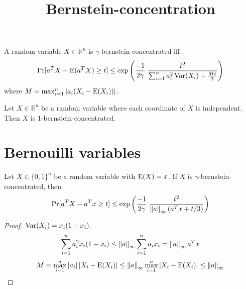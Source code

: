 

\title{Bernstein-concentration}



\maketitle
\initMinimal{}

\begin{definition}
A random variable $X \in \mathbb{R}^n$ is $\gamma$-bernstein-concentrated iff
\[ \Pr[a^TX - \operatorname*{E}(a^TX) \ge t]
\le \exp\left( \frac{-1}{2\gamma} \; \frac{t^2}{\sum_{i=1}^n a_i^2 \operatorname*{Var}(X_i) + \frac{Mt}{3}} \right) \]
where $M = \max_{i=1}^n \left\lvert a_i(X_i - \operatorname*{E}(X_i)) \right\rvert$.
\end{definition}

\begin{theorem}
Let $X \in \mathbb{R}^n$ be a random variable where each coordinate of $X$ is independent.
Then $X$ is $1$-bernstein-concentrated.
\end{theorem}

\section{Bernouilli variables}

\begin{theorem}
\label{thm:refined-bern-conc}
Let $X \in \{0, 1\}^n$ be a random variable with $\operatorname*{E}(X) = x$.
If $X$ is $\gamma$-bernstein-concentrated, then
\[ \Pr[a^TX - a^Tx \ge t]
\le \exp\left( \frac{-1}{2\gamma} \; \frac{t^2}{\left\lVert a \right\rVert_{\infty}(a^Tx + t/3)} \right) \]
\end{theorem}
\begin{proof}
$\operatorname*{Var}(X_i) = x_i(1-x_i)$.
\[ \sum_{i=1}^n a_i^2 x_i(1-x_i)
\le \left\lVert a \right\rVert_{\infty} \sum_{i=1}^n a_ix_i
= \left\lVert a \right\rVert_{\infty} a^Tx \]
\[ M = \max_{i=1}^n \left\lvert a_i \right\rvert\left\lvert X_i - \operatorname*{E}(X_i) \right\rvert
\le \left\lVert a \right\rVert_{\infty} \max_{i=1}^n \left\lvert X_i - \operatorname*{E}(X_i) \right\rvert
\le \left\lVert a \right\rVert_{\infty} \]
\end{proof}

